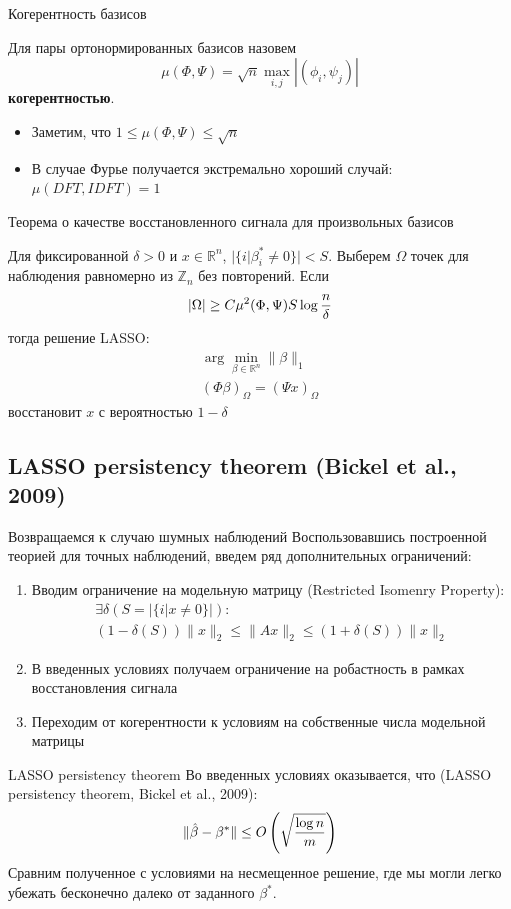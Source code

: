 \documentclass[14pt, fleqn, xcolor={dvipsnames, table}]{beamer}
\begin{document}
\begin{frame}{Когерентность базисов}
\small
\begin{definition}
Для пары ортонормированных базисов назовем
$$
\mu(\Phi, \Psi) = \sqrt{n}\max_{i,j} |(\phi_i, \psi_j)|
$$
\textbf{когерентностью}.
\end{definition}
\begin{itemize}
  \item Заметим, что $1 \le \mu(\Phi,\Psi) \le \sqrt{n}$
  \item В случае Фурье получается экстремально хороший случай: $\mu(DFT,IDFT) = 1$
\end{itemize}
\end{frame}

\begin{frame}{Теорема о качестве восстановленного сигнала для произвольных базисов}
\small
\begin{theorem}
Для фиксированной $\delta > 0$ и $x \in \mathbb{R}^n$, $|\{i | \beta^*_i \ne 0\}| < S$. Выберем $\Omega$ точек для наблюдения равномерно из $\mathbb{Z}_n$ без повторений. Если
$$|\Omega| \ge C \mu^2(\Phi,\Psi)S\log {n\over\delta}$$
тогда решение LASSO:
$$\begin{array}{l}
\arg \min_{\beta \in \mathbb{R}^n} \|\beta\|_1 \\
(\Phi \beta)_\Omega = (\Psi x)_\Omega
\end{array}$$
восстановит $x$ с вероятностью $1 - \delta$
\end{theorem}
\end{frame}

\subsection{LASSO persistency theorem (Bickel et al., 2009)}
\begin{frame}{Возвращаемся к случаю шумных наблюдений}
\small
Воспользовавшись построенной теорией для точных наблюдений, введем ряд дополнительных ограничений:
\begin{enumerate}
  \item Вводим ограничение на модельную матрицу (Restricted Isomenry Property): 
  $$\begin{array}{l}
  \exists \delta(S = |\{i | x \ne 0\}|): \\
  (1-\delta(S)) \|x\|_2 \le \|Ax\|_2 \le (1 + \delta(S)) \|x\|_2
  \end{array}$$
  \item В введенных условиях получаем ограничение на робастность в рамках восстановления сигнала
  \item Переходим от когерентности к условиям на собственные числа модельной матрицы
\end{enumerate}
\end{frame}
\begin{frame}{LASSO persistency theorem}
Во введенных условиях оказывается, что (LASSO persistency theorem, Bickel et al., 2009):
$$
\|\hat{\beta} - \beta^*\| \le O\left(\sqrt{\log n \over m}\right)
$$
Сравним полученное с условиями на несмещенное решение, где мы могли легко убежать бесконечно далеко от заданного $\beta^*$. 

\end{frame}
\end{document}
